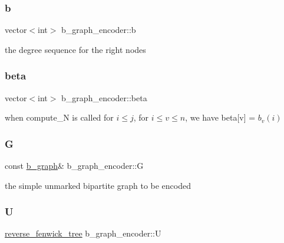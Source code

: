 \subsubsection{\texorpdfstring{b}{b}}
{\footnotesize\ttfamily vector$<$int$>$ b\+\_\+graph\+\_\+encoder\+::b\hspace{0.3cm}{\ttfamily [private]}}



the degree sequence for the right nodes 

\mbox{\label{classb__graph__encoder_ae54d76cc4cee399d98951f870897a144}} 
\subsubsection{\texorpdfstring{beta}{beta}}
{\footnotesize\ttfamily vector$<$int$>$ b\+\_\+graph\+\_\+encoder\+::beta\hspace{0.3cm}{\ttfamily [private]}}



when compute\+\_\+N is called for $i \leq j$, for $ i \leq v \leq n$, we have beta\mbox{[}v\mbox{]} = $b_v(i)$ 

\mbox{\label{classb__graph__encoder_af969e24f445db0e54513086604e2c165}} 
\subsubsection{\texorpdfstring{G}{G}}
{\footnotesize\ttfamily const \hyperlink{classb__graph}{b\+\_\+graph}\& b\+\_\+graph\+\_\+encoder\+::G\hspace{0.3cm}{\ttfamily [private]}}



the simple unmarked bipartite graph to be encoded 

\mbox{\label{classb__graph__encoder_ac810138443002a2b2cf579ced2dc34ce}} 
\subsubsection{\texorpdfstring{U}{U}}
{\footnotesize\ttfamily \hyperlink{classreverse__fenwick__tree}{reverse\+\_\+fenwick\+\_\+tree} b\+\_\+graph\+\_\+encoder\+::U\hspace{0.3cm}{\ttfamily [private]}}



